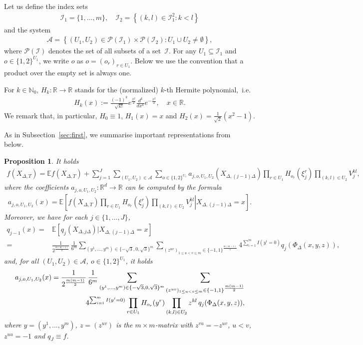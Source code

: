\documentclass[11pt,a4paper]{amsart}
\theoremstyle{plain}
\newtheorem{proposition}[theorem]{Proposition}
\theoremstyle{definition}
\theoremstyle{remark}
\numberwithin{equation}{section}
\newcommand*{\EE}{\mathbb E}
\newcommand*{\bbN}{\mathbb N}
\newcommand*{\bbR}{\mathbb R}
\newcommand*{\cA}{\mathcal A}
\newcommand*{\cI}{\mathcal I}
\renewcommand*{\doteq}{:=}
\begin{document}
Let us define the index sets
\begin{align*}
\cI_1=\{1,\ldots,m\},\quad
\cI_2=\left\{(k,l)\in\cI_1^2:k<l\right\}
\end{align*}
and the system
\begin{align*}
\cA=\left\{(U_1,U_2)\in\mathcal P(\cI_1)\times\mathcal
P(\cI_2):U_1\cup U_2\ne\emptyset\right\},
\end{align*}
where $\mathcal P(\cI)$ denotes
the set of all subsets of a set~$\cI$.
For any $U_1\subseteq\cI_1$
and $o\in\{1,2\}^{U_1}$,
we write $o$ as
$o=(o_r)_{r\in U_1}$.
Below we use the convention
that a product over the empty set
is always one.

For $k\in\bbN_0$,
$H_k\colon\bbR\to\bbR$
stands for the (normalized) $k$-th Hermite polynomial,~i.e.
\begin{align*}
  H_k(x) 
  \doteq 
  \frac{(-1)^k}
    {\sqrt{k!}}
  e^{\frac{x^2}{2}}
  \frac{d^k}{dx^k}e^{-\frac{x^2}{2}},
  \quad x\in\bbR.
\end{align*}
We remark that, in particular,
$H_0\equiv1$, $H_1(x)=x$ and $H_2(x)=\frac1{\sqrt2}(x^2-1)$.

As in Subsection~\ref{sec:first}, we summarise important representations from~\cite{belomestny2016variance} below. 

\begin{proposition}
\label{th:weak_md03}
It holds
\begin{align}
\label{eq:2002a1}
f(X_{\Delta,T})=\EE f(X_{\Delta,T})
+\sum_{j=1}^J
\sum_{(U_1,U_2)\in\cA}
\sum_{o\in\{1,2\}^{U_1}}
a_{j,o,U_1,U_2}(X_{\Delta,(j-1)\Delta})
\prod_{r\in U_1} H_{o_r}(\xi_j^r)
\prod_{(k,l)\in U_2} V_j^{kl},
\end{align}
where the coefficients
$a_{j,o,U_1,U_2}\colon\bbR^d\to\bbR$
can be computed by the formula
\begin{align}
\label{eq:2002a2}
a_{j,o,U_1,U_2}(x)
=\EE\left[\left.
f(X_{\Delta,T})
\prod_{r\in U_1} H_{o_r}(\xi_j^r)
\prod_{(k,l)\in U_2} V_j^{kl}
\right| X_{\Delta,(j-1)\Delta}=x
\right].
\end{align}
Moreover, we have for each $j\in\{1,\ldots,J\}$,
\begin{align*}
q_{j-1}(x)=&\EE[q_{j}(X_{\Delta,j\Delta})|X_{\Delta,(j-1)\Delta}=x]
\\
=&\frac{1}{2^{\frac{m(m-1)}{2}}}\,\frac{1}{6^{m}}\sum_{(y^{1},\ldots,y^{m})\in\{-\sqrt{3},0,\sqrt{3}\}^{m}}\sum_{(z^{uv})_{1\le u<v\le m}\in\{-1,1\}^{\frac{m(m-1)}{2}}}4^{\sum_{i=1}^{m}I(y^{i}=0)}q_j(\Phi_\Delta(x,y,z)),
\end{align*}
and, for all $(U_1,U_2)\in\cA$, $o\in\{1,2\}^{U_1}$,
it holds
\begin{align}
\label{eq:0403a11}
a_{j,o,U_1,U_2}(x)=\frac{1}{2^{\frac{m(m-1)}{2}}}\,\frac{1}{6^{m}}\sum_{(y^{1},\ldots,y^{m})\in\{-\sqrt{3},0,\sqrt{3}\}^{m}}\sum_{(z^{uv})_{1\le u<v\le m}\in\{-1,1\}^{\frac{m(m-1)}{2}}}\\
\notag 4^{\sum_{i=1}^{m}I(y^{i}=0)}
\prod_{r\in U_1}H_{o_r}(y^r)
\prod_{(k,l)\in U_2}z^{kl}\,
q_j(\Phi_\Delta(x,y,z)),
\end{align}
where $y=(y^1,\ldots,y^m)$, $z=(z^{uv})$ is the $m\times m$-matrix
with $z^{vu}=-z^{uv}$, $u<v$, $z^{uu}=-1$ and $q_J\equiv f$.
\end{proposition}
\end{document}
